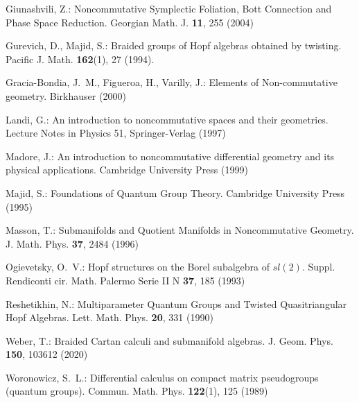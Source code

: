 \documentclass[a4paper,11pt]{article}
\begin{document}
\begin{thebibliography}{99}
Giunashvili, Z.:
\newblock Noncommutative Symplectic Foliation, Bott Connection and Phase Space
Reduction.
\newblock Georgian Math. J. \textbf{11}, 255
(2004)

Gurevich, D., Majid, S.:
\newblock Braided groups of Hopf algebras obtained by twisting.
\newblock Pacific J. Math. \textbf{162}(1), 27 %
(1994).

Gracia-Bondia, J.~M., Figueroa, H., Varilly, J.:
\newblock Elements of Non-commutative geometry.
\newblock Birkhauser (2000) 

Landi, G.:
\newblock An introduction to noncommutative spaces and their geometries.
\newblock Lecture Notes in Physics 51, Springer-Verlag (1997)

Madore, J.:
\newblock An introduction to noncommutative differential 
geometry and its physical applications.
\newblock Cambridge University Press (1999)

Majid, S.:
\newblock Foundations of Quantum Group Theory.
\newblock Cambridge University Press (1995)

Masson, T.:
\newblock Submanifolds and Quotient Manifolds in Noncommutative Geometry.
J. Math. Phys. \textbf{37}, 2484 (1996)%

Ogievetsky, O.~V.:
\newblock Hopf structures on the Borel subalgebra of $sl(2)$.
Suppl. Rendiconti cir. Math. Palermo
Serie II N \textbf{37}, 185 (1993)

Reshetikhin, N.:
\newblock Multiparameter Quantum Groups and Twisted Quasitriangular Hopf Algebras. \newblock Lett. Math. Phys. \textbf{20}, 331
(1990)

Weber, T.:
\newblock Braided Cartan calculi and submanifold algebras.
\newblock J. Geom. Phys. \textbf{150}, 103612 (2020)

Woronowicz, S.~L.:
\newblock Differential calculus on compact matrix pseudogroups (quantum groups). 
\newblock Commun. Math. Phys. \textbf{122}(1), 125
(1989)
\end{thebibliography}


\end{document}
